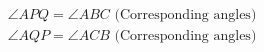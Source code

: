 \documentclass[preview]{standalone}
\begin{document}
\begin{align*}
\angle APQ = \angle ABC \text{ (Corresponding angles)} \\ \angle AQP = \angle ACB \text{ (Corresponding angles)}
\end{align*}
\end{document}
